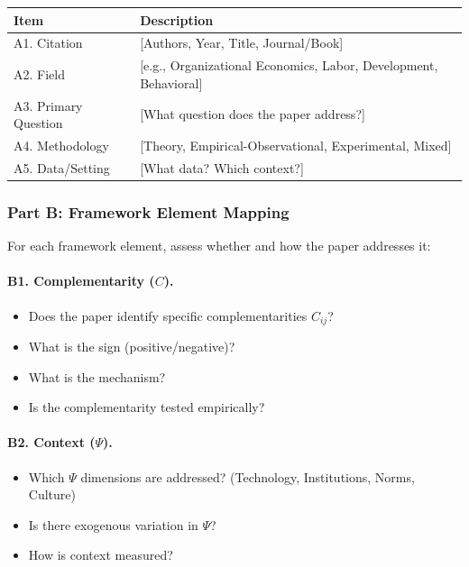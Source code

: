 \begin{center}
\renewcommand{\arraystretch}{1.3}
\begin{tabular}{lp{10cm}}
\hline
\textbf{Item} & \textbf{Description} \\
\hline
A1. Citation & [Authors, Year, Title, Journal/Book] \\
A2. Field & [e.g., Organizational Economics, Labor, Development, Behavioral] \\
A3. Primary Question & [What question does the paper address?] \\
A4. Methodology & [Theory, Empirical-Observational, Experimental, Mixed] \\
A5. Data/Setting & [What data? Which context?] \\
\hline
\end{tabular}
\end{center}

\subsubsection{Part B: Framework Element Mapping}

For each framework element, assess whether and how the paper addresses it:

\paragraph{B1. Complementarity ($C$).}
\begin{itemize}
  \item Does the paper identify specific complementarities $C_{ij}$?
  \item What is the sign (positive/negative)?
  \item What is the mechanism?
  \item Is the complementarity tested empirically?
\end{itemize}

\paragraph{B2. Context ($\Psi$).}
\begin{itemize}
  \item Which $\Psi$ dimensions are addressed? (Technology, Institutions, Norms, Culture)
  \item Is there exogenous variation in $\Psi$?
  \item How is context measured?
\end{itemize}

